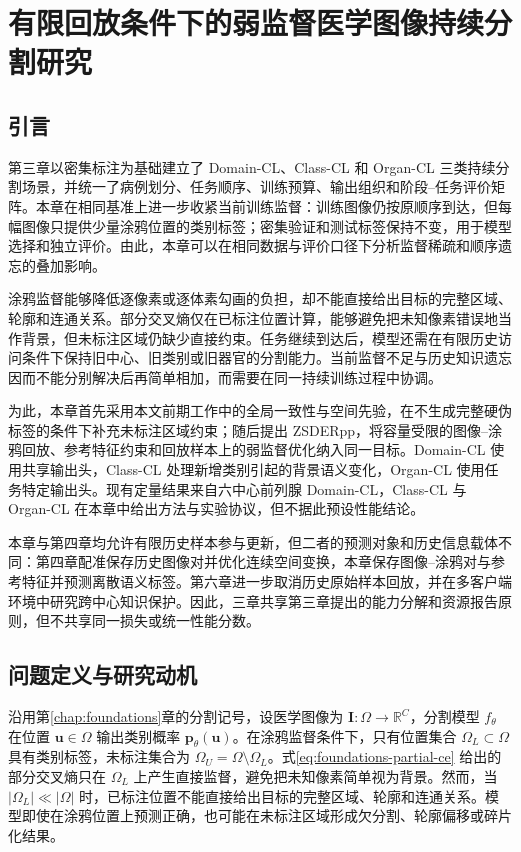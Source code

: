 \chapter{有限回放条件下的弱监督医学图像持续分割研究}
\label{chap:scribblecl}
\setlength{\emergencystretch}{1em}

\section{引言}
\label{sec:scribblecl-introduction}

第三章以密集标注为基础建立了 Domain-CL、Class-CL 和 Organ-CL 三类持续分割场景，并统一了病例划分、任务顺序、训练预算、输出组织和阶段--任务评价矩阵。本章在相同基准上进一步收紧当前训练监督：训练图像仍按原顺序到达，但每幅图像只提供少量涂鸦位置的类别标签；密集验证和测试标签保持不变，用于模型选择和独立评价。由此，本章可以在相同数据与评价口径下分析监督稀疏和顺序遗忘的叠加影响。

涂鸦监督能够降低逐像素或逐体素勾画的负担，却不能直接给出目标的完整区域、轮廓和连通关系。部分交叉熵仅在已标注位置计算，能够避免把未知像素错误地当作背景，但未标注区域仍缺少直接约束。任务继续到达后，模型还需在有限历史访问条件下保持旧中心、旧类别或旧器官的分割能力。当前监督不足与历史知识遗忘因而不能分别解决后再简单相加，而需要在同一持续训练过程中协调。

为此，本章首先采用本文前期工作中的全局一致性与空间先验，在不生成完整硬伪标签的条件下补充未标注区域约束\cite{zhang2026zscribbleseg}；随后提出 ZSDERpp，将容量受限的图像--涂鸦回放、参考特征约束和回放样本上的弱监督优化纳入同一目标。Domain-CL 使用共享输出头，Class-CL 处理新增类别引起的背景语义变化，Organ-CL 使用任务特定输出头。现有定量结果来自六中心前列腺 Domain-CL，Class-CL 与 Organ-CL 在本章中给出方法与实验协议，但不据此预设性能结论。

本章与第四章均允许有限历史样本参与更新，但二者的预测对象和历史信息载体不同：第四章配准保存历史图像对并优化连续空间变换，本章保存图像--涂鸦对与参考特征并预测离散语义标签。第六章进一步取消历史原始样本回放，并在多客户端环境中研究跨中心知识保护。因此，三章共享第三章提出的能力分解和资源报告原则，但不共享同一损失或统一性能分数。

\section{问题定义与研究动机}
\label{sec:scribblecl-formulation}

沿用第\ref{chap:foundations}章的分割记号，设医学图像为
$\mathbf{I}:\Omega\rightarrow\mathbb{R}^{C}$，分割模型
$f_{\theta}$ 在位置 $\mathbf{u}\in\Omega$ 输出类别概率
$\mathbf{p}_{\theta}(\mathbf{u})$。在涂鸦监督条件下，只有位置集合
$\Omega_L\subset\Omega$ 具有类别标签，未标注集合为
$\Omega_U=\Omega\setminus\Omega_L$。式\eqref{eq:foundations-partial-ce}
给出的部分交叉熵只在 $\Omega_L$ 上产生直接监督，避免把未知像素简单视为背景。然而，当 $|\Omega_L|\ll|\Omega|$ 时，已标注位置不能直接给出目标的完整区域、轮廓和连通关系。模型即使在涂鸦位置上预测正确，也可能在未标注区域形成欠分割、轮廓偏移或碎片化结果。

